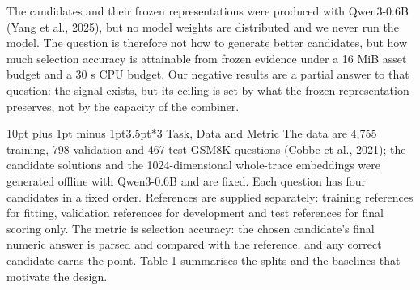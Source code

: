 \documentclass[10pt,a4paper]{article}
\makeatletter
\renewcommand\section{\@startsection{section}{1}{\z@}%
  {10pt plus 1pt minus 1pt}{3.5pt}{\normalfont\large\bfseries}}
\makeatother
\begin{document}
The candidates and their frozen representations were produced with Qwen3-0.6B (Yang et al., 2025), but no model weights are distributed and we never run the model. The question is therefore not how to generate better candidates, but how much selection accuracy is attainable from frozen evidence under a 16 MiB asset budget and a 30 s CPU budget. Our negative results are a partial answer to that question: the signal exists, but its ceiling is set by what the frozen representation preserves, not by the capacity of the combiner.

\section*{3 Task, Data and Metric}
The data are 4,755 training, 798 validation and 467 test GSM8K questions (Cobbe et al., 2021); the candidate solutions and the 1024-dimensional whole-trace embeddings were generated offline with Qwen3-0.6B and are fixed. Each question has four candidates in a fixed order. References are supplied separately: training references for fitting, validation references for development and test references for final scoring only. The metric is selection accuracy: the chosen candidate’s final numeric answer is parsed and compared with the reference, and any correct candidate earns the point. Table 1 summarises the splits and the baselines that motivate the design.
\end{document}
